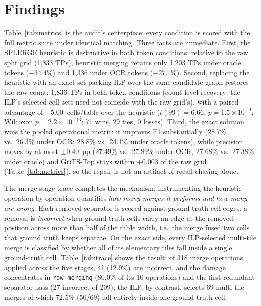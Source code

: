 \documentclass[final,5p,times,twocolumn]{elsarticle}
\newcommand{\ie}{i.e.}
\begin{document}
\section{Findings}\label{sec:findings}

Table~\ref{tab:metrics} is the audit's centerpiece: every condition is scored
with the full metric suite under identical matching. Three facts are
immediate. First, the SPLERGE heuristic is destructive in both token
conditions: relative to the raw split grid (1{,}833 TPs), heuristic merging
retains only 1{,}203 TPs under oracle tokens ($-34.4\%$) and 1{,}336 under
OCR tokens ($-27.1\%$). Second, replacing the heuristic with an exact
set-packing ILP over the same candidate graph restores the raw count:
1{,}836 TPs in both token conditions (count-level recovery: the ILP's
selected cell sets need not coincide with the raw grid's), with a paired
advantage of
$+5.00$~cells/table over the heuristic ($t(99)=6.66$,
$p=1.5\times 10^{-9}$; Wilcoxon $p=2.2\times 10^{-13}$; 71 wins, 29 ties,
0 losses). Third, the exact solution wins the pooled operational metric: it
improves F1 substantially (28.7\% vs.\ 26.3\% under OCR; 28.8\% vs.\ 24.1\%
under oracle tokens), while precision moves by at most $\pm 0.40$~pp (27.49\%
vs.\ 27.89\% under OCR, 27.68\% vs.\ 27.38\% under oracle) and GriTS-Top stays
within $+0.003$ of the raw grid (Table~\ref{tab:metrics}), so the repair is
not an artifact of recall-chasing alone.

The merge-stage trace completes the mechanism: instrumenting the heuristic
operation by operation quantifies \emph{how many merges it performs and how
many are wrong}. Each removed separator is scored against ground-truth cell
edges: a removal is \emph{incorrect} when ground-truth cells carry an edge at
the removed position across more than half of the table width, \ie\ the merge
fused two cells that ground truth keeps separate. On the exact side, every
ILP-selected multi-tile merge is classified by whether all of its elementary
tiles fall inside a single ground-truth cell. Table~\ref{tab:trace} shows the
result: of 318 merge operations applied across the five stages, 41 (12.9\%)
are incorrect, and the damage concentrates in \texttt{row\_merging} (80.0\%
of its 10 operations) and the first redundant-separator pass (27 incorrect of
209); the ILP, by contrast, selects 69 multi-tile merges of which 72.5\%
(50/69) fall entirely inside one ground-truth cell.
\end{document}
